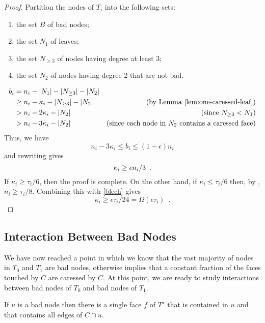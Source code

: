 \documentclass{patmorin}
\newcommand{\dual}[1]{{#1}^\star}
\begin{document}
\begin{proof}
   Partition the nodes of $T_i$ into the following sets:
   \begin{enumerate}
       \item the set $B$ of bad nodes;
       \item the set $N_1$ of leaves;
       \item the set $N_{\ge 3}$ of nodes having degree at least 3;
       \item the set $N_2$ of nodes having degree 2 that are not bad.
   \end{enumerate}
   \begin{align*}
     b_i & = n_i - |N_1|- |N_{\ge 3}|-|N_2| \\
         & \ge  n_i - \kappa_i - |N_{\ge 3}|-|N_2| 
           & \text{(by \lemref{one-caressed-leaf})} \\
          & >  n_i - 2\kappa_i -|N_2| 
           & \text{(since $N_{\ge 3} < N_1$)} \\
           & >  n_i - 3\kappa_i -|N_2| 
           & \text{(since each node in $N_2$ contains a caressed face)}
    \end{align*}
    Thus, we have
    \[
          n_i-3\kappa_i \le b_i \le (1-\epsilon)n_i
    \]
    and rewriting gives 
    \begin{equation}
      \kappa_i \ge \epsilon n_i/3 \enspace . \eqlabel{blech}
    \end{equation}
    If $\kappa_i \ge \tau_i/6$, then the proof is complete.  On the other hand, if $\kappa_i \le \tau_i/6$ then, by , $n_i \ge \tau_i/8$. Combining this with \eqref{blech}  gives
    \[
      \kappa_i \ge \epsilon\tau_i/24 = \Omega(\epsilon \tau_i) \enspace .
    \]
\end{proof}

\subsection{Interaction Between Bad Nodes}

We have now reached a point in which we know that the vast
majority of nodes in $T_0$ and $T_1$ are bad nodes, otherwise
 implies that a constant fraction of the
faces touched by $C$ are caressed by $C$.  At this point, we are ready
to study interactions between bad nodes of $T_0$ and bad nodes of $T_1$.


\begin{lem}
   If $u$ is a bad node then there is a single face $f$ of $\dual{T}$
   that is contained in $u$ and that contains all edges of $C\cap u$.
\end{lem}
\end{document}
